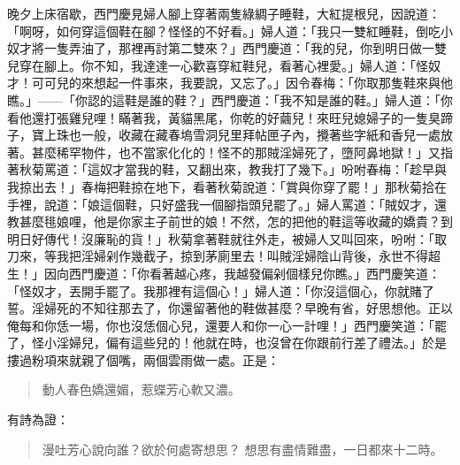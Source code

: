 晚夕上床宿歇，西門慶見婦人腳上穿著兩隻綠綢子睡鞋，大紅提根兒，因說道：「啊呀，如何穿這個鞋在腳？怪怪的不好看。」婦人道：「我只一雙紅睡鞋，倒吃小奴才將一隻弄油了，那裡再討第二雙來？」西門慶道：「我的兒，你到明日做一雙兒穿在腳上。你不知，我達達一心歡喜穿紅鞋兒，看著心裡愛。」婦人道：「怪奴才！可可兒的來想起一件事來，我要說，又忘了。」因令春梅：「你取那隻鞋來與他瞧。」——「你認的這鞋是誰的鞋？」西門慶道：「我不知是誰的鞋。」婦人道：「你看他還打張雞兒哩！瞞著我，黃貓黑尾，你乾的好繭兒！來旺兒媳婦子的一隻臭蹄子，寶上珠也一般，收藏在藏春塢雪洞兒里拜帖匣子內，攪著些字紙和香兒一處放著。甚麼稀罕物件，也不當家化化的！怪不的那賊淫婦死了，墮阿鼻地獄！」又指著秋菊罵道：「這奴才當我的鞋，又翻出來，教我打了幾下。」吩咐春梅：「趁早與我掠出去！」春梅把鞋掠在地下，看著秋菊說道：「賞與你穿了罷！」那秋菊拾在手裡，說道：「娘這個鞋，只好盛我一個腳指頭兒罷了。」婦人罵道：「賊奴才，還教甚麼毴娘哩，他是你家主子前世的娘！不然，怎的把他的鞋這等收藏的嬌貴？到明日好傳代！沒廉恥的貨！」秋菊拿著鞋就往外走，被婦人又叫回來，吩咐：「取刀來，等我把淫婦剁作幾截子，掠到茅廁里去！叫賊淫婦陰山背後，永世不得超生！」因向西門慶道：「你看著越心疼，我越發偏剁個樣兒你瞧。」西門慶笑道：「怪奴才，丟開手罷了。我那裡有這個心！」婦人道：「你沒這個心，你就賭了誓。淫婦死的不知往那去了，你還留著他的鞋做甚麼？早晚有省，好思想他。正以俺每和你恁一場，你也沒恁個心兒，還要人和你一心一計哩！」西門慶笑道：「罷了，怪小淫婦兒，偏有這些兒的！他就在時，也沒曾在你跟前行差了禮法。」於是摟過粉項來就親了個嘴，兩個雲雨做一處。正是：
\begin{quote}
動人春色嬌還媚，惹蝶芳心軟又濃。
\end{quote}
有詩為證：
\begin{quote}
漫吐芳心說向誰？欲於何處寄想思？
想思有盡情難盡，一日都來十二時。
\end{quote}
